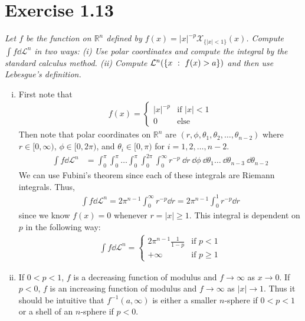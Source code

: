 \documentclass[12pt]{article}
\theoremstyle{plain}
\begin{document}
\section*{Exercise 1.13}
\textit{Let $f$ be the function on $\mathbb{R}^n$ defined by $f(x) = |x|^{-p}\mathcal{X}_{\{|x| < 1\}}(x)$.  Compute $\int f \dd \mathcal{L}^n$ in two ways: (i) Use polar coordinates and compute the integral by the standard calculus method.  (ii) Compute $\mathcal{L}^n\qty(\{x\ :\ f(x) > a\})$ and then use Lebesgue's definition.}
\begin{enumerate}[(i)]
    \item
        First note that
        \begin{align*}
            f(x) =
            \begin{cases} 
                |x|^{-p} & \text{if $|x| < 1$} \\
                0 & \text{else}
            \end{cases}
        \end{align*}
        Then note that polar coordinates on $\mathbb{R}^n$ are $(r, \phi, \theta_1, \theta_2, \dots, \theta_{n-2})$ where $r \in [0, \infty)$, $\phi \in [0, 2\pi)$, and $\theta_i \in [0, \pi)$ for $i = 1, 2, \dots, n - 2$.
        \begin{align*}
            \int f \dd \mathcal{L}^n &= \int_0^\pi \int_0^\pi \dots \int_0^\pi \int_0^{2\pi} \int_0^\infty r^{-p}\ \dd r\ \dd \phi\ \dd \theta_1 \dots\ \dd \theta_{n-3}\ \dd \theta_{n-2}
        \end{align*}
        We can use Fubini's theorem since each of these integrals are Riemann integrals.  Thus,
        \begin{align*}
            \int f \dd \mathcal{L}^n = 2\pi^{n-1}\int_0^\infty r^{-p} \dd r = 2\pi^{n-1}\int_0^1 r^{-p} \dd r
        \end{align*}
        since we know $f(x) = 0$ whenever $r = |x| \geq 1$.  This integral is dependent on $p$ in the following way:
        \begin{align*}
            \int f \dd \mathcal{L}^n = \begin{cases}
                2\pi^{n-1}\frac{1}{1 - p} & \text{if $p < 1$} \\
                +\infty & \text{if $p \geq 1$}
            \end{cases}
        \end{align*}
    \item
        If $0 < p < 1$, $f$ is a decreasing function of modulus and $f\rightarrow\infty$ as $x\rightarrow 0$.  If $p < 0$, $f$ is an increasing function of modulus and $f \rightarrow \infty$ as $|x|\rightarrow 1$.  Thus it should be intuitive that $f^{-1}(a, \infty)$ is either a smaller $n$-sphere if $0 < p < 1$ or a shell of an $n$-sphere if $p < 0$.

\end{enumerate}
\end{document}
